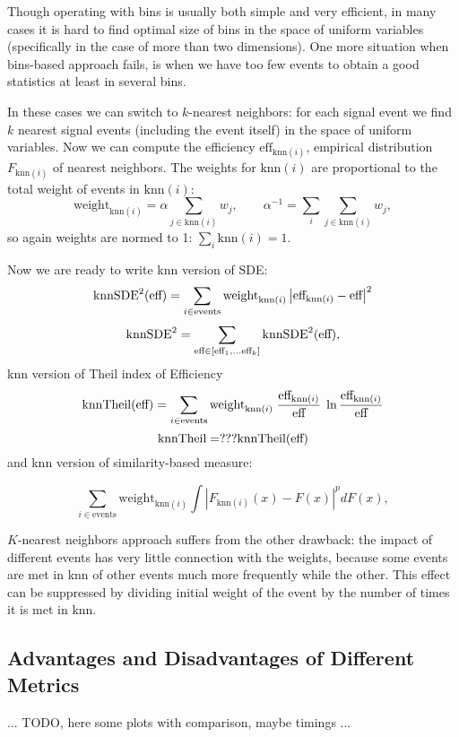 \documentclass{JINST}
\theoremstyle{definition}
\theoremstyle{remark}
\newcommand{\abs}[1]{\left\vert#1\right\vert}
\begin{document}
\def\knni{\text{knn}(i)}
\def\effknni{\text{eff}_{\knni}}
\def\weightknni{\text{weight}_{\knni}}
\def\Fknn{F_{\knni}}

\def\knnSDE{\text{knnSDE}}

Though operating with bins is usually both simple and very efficient, 
in many cases it is hard to find optimal size of bins in the space of uniform variables (specifically in the case of more than two dimensions).
One more situation when bins-based approach fails, is when we have too few events to obtain a good statistics at least in several bins.

In these cases we can switch to $k$-nearest neighbors: for each signal event we find $k$ nearest signal events (including the event itself) in the space of uniform variables. Now we can compute the efficiency $\effknni$, empirical distribution $\Fknn$ of nearest neighbors. 
The weights for $\knni$ are proportional to the total weight of events in $\knni$:
\[
	\weightknni = \alpha \sum_{j \in \knni} w_j, \qquad \alpha^{-1} = \sum_i \sum_{j \in \knni} w_j,
\]
so again weights are normed to 1: $\sum_{i} \knni = 1$. 

Now we are ready to write knn version of SDE:
\[
	\knnSDE^2(\globaleff)
		= \sum_{i \in \text{events}} \weightknni \abs{\effknni - \globaleff}^2
\]
\[
	\knnSDE^2 = \sum_{\globaleff \in [\globaleff_1, \dots \globaleff_k]}
		\knnSDE^2(\globaleff),
\]
knn version of Theil index of Efficiency
\[
	\text{knnTheil}(\globaleff) = \sum_{i \in \text{events}} \weightknni \; \frac{\effknni}{\globaleff} \; \ln{\frac{\effknni}{\globaleff}}
\]
\[
	\text{knnTheil} = ??? \text{knnTheil}(\text{eff})
\]
and knn version of similarity-based measure:

\[
	 \sum_{i \in \text{events}} \weightknni \int \abs{\Fknn(x) - F(x)}^p dF(x),
\]


$K$-nearest neighbors approach suffers from the other drawback: the impact of different events has very little connection with the weights, because some events are met in knn of other events much more frequently while the other.
This effect can be suppressed by dividing initial weight of the event by the number of times it is met in knn. 




\subsection{Advantages and Disadvantages of Different Metrics}

... TODO, here some plots with comparison, maybe timings ...
\end{document}
